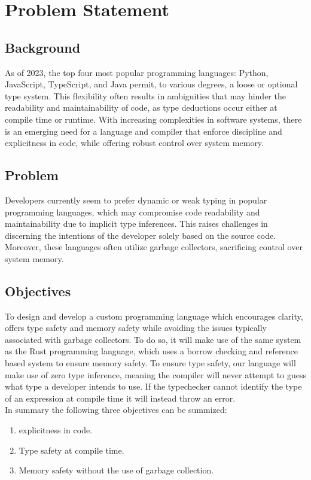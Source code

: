 \section{Problem Statement}
\label{sec:ProblemStatement}

\subsection{Background}

As of 2023, the top four most popular programming languages: Python, JavaScript,
TypeScript, and Java permit, to various degrees, a loose or optional type
system\cite{STACK}. This flexibility often results in ambiguities that may hinder the
readability and maintainability of code, as type deductions occur either at compile
time or runtime. With increasing complexities in software systems, there is an
emerging need for a language and compiler that enforce discipline and explicitness in
code, while offering robust control over system memory.

\subsection{Problem}

Developers currently seem to prefer dynamic or weak typing in popular programming
languages, which may compromise code readability and maintainability due to implicit
type inferences. This raises challenges in discerning the intentions of the developer
solely based on the source code. Moreover, these languages often utilize garbage
collectors, sacrificing control over system memory.

\subsection{Objectives}
\label{sec:Objectives}

To design and develop a custom programming language which encourages clarity, offers
type safety and memory safety while avoiding the issues typically associated with
garbage collectors. To do so, it will make use of the same system as the Rust programming
language, which uses a borrow checking and reference based system to ensure memory
safety\cite{RUST}. To ensure type safety, our language will make use of zero type
inference, meaning the compiler will never attempt to guess what type a developer
intends to use. If the typechecker cannot identify the type of an expression at
compile time it will instead throw an error. \\

In summary the following three objectives can be summized:

\begin{enumerate}
  \item explicitness in code.
  \item Type safety at compile time.
  \item Memory safety without the use of garbage collection.
\end{enumerate}
